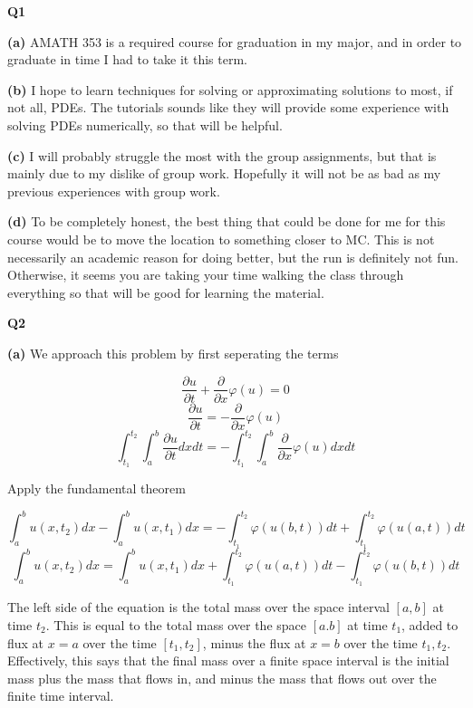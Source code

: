 \documentclass[10pt]{article}
\begin{document}
\textbf{Q1}

\textbf{(a)}
AMATH 353 is a required course for graduation in my major, and in order to graduate in time I had to take it this term.

\textbf{(b)}
I hope to learn techniques for solving or approximating solutions to most, if not all, PDEs. The tutorials sounds like they will provide some experience with solving PDEs numerically, so that will be helpful.

\textbf{(c)}
I will probably struggle the most with the group assignments, but that is mainly due to my dislike of group work. Hopefully it will not be as bad as my previous experiences with group work.

\textbf{(d)}
To be completely honest, the best thing that could be done for me for this course would be to move the location to something closer to MC. This is not necessarily an academic reason for doing better, but the run is definitely not fun. Otherwise, it seems you are taking your time walking the class through everything so that will be good for learning the material.

\newpage

\textbf{Q2}

\textbf{(a)}
We approach this problem by first seperating the terms

$$\frac{\partial u}{\partial t} + \frac{\partial}{\partial x} \varphi(u) = 0$$
$$\frac{\partial u}{\partial t} = -\frac{\partial}{\partial x} \varphi(u)$$
$$\int_{t_{1}}^{t_{2}}\int_{a}^{b}\frac{\partial u}{\partial t}dxdt = -\int_{t_{1}}^{t_{2}}\int_{a}^{b}\frac{\partial}{\partial x} \varphi(u)dxdt$$

Apply the fundamental theorem

$$\int_{a}^{b}u(x,t_{2})dx - \int_{a}^{b}u(x,t_{1})dx = -\int_{t_{1}}^{t_{2}}\varphi (u(b,t))dt + \int_{t_{1}}^{t_{2}}\varphi (u(a,t))dt$$
$$\int_{a}^{b}u(x,t_{2})dx = \int_{a}^{b}u(x,t_{1})dx+ \int_{t_{1}}^{t_{2}}\varphi (u(a,t))dt-\int_{t_{1}}^{t_{2}}\varphi (u(b,t))dt$$

The left side of the equation is the total mass over the space interval $[a,b]$ at time $t_{2}$. This is equal to the total mass over the space $[a.b]$ at time $t_{1}$, added to flux at $x=a$ over the time $[t_{1},t_{2}]$, minus the flux at $x=b$ over the time $t_{1},t_{2}$. Effectively, this says that the final mass over a finite space interval is the initial mass plus the mass that flows in, and minus the mass that flows out over the finite time interval.

\newpage
\end{document}
